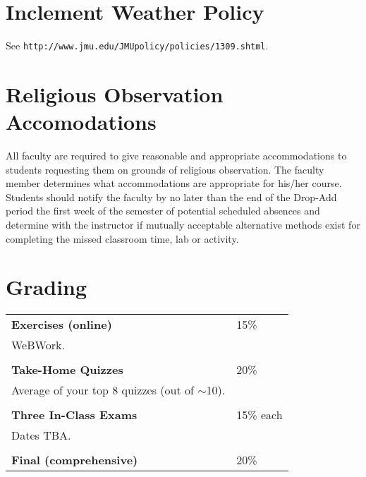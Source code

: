 \documentclass[margin,line,pifont,palatino,courier]{res}
\begin{document}
\begin{resume}
\section{\sc Inclement Weather Policy} See \verb+http://www.jmu.edu/JMUpolicy/policies/1309.shtml+. %

\vspace{0.5pc}
\section{\sc Religious Observation \\ Accomodations} All faculty are required to give reasonable and appropriate accommodations to students requesting them on grounds of religious observation. The faculty member determines what accommodations are appropriate for his/her course. Students should notify the faculty by no later than the end of the Drop-Add period the first week of the semester of potential scheduled absences and determine with the instructor if mutually acceptable alternative methods exist for completing the missed classroom time, lab or activity.


\section{\sc Grading} 
\begin{supertabular}{@{}p{0.6\textwidth} l}
	{\bf Exercises (online)} & 15\% \\
		WeBWork. & \\
		 & \\
{\bf Take-Home Quizzes} & 20\% \\
	Average of your top 8 quizzes (out of $\sim$10). & \\
 & \\
 {\bf Three In-Class Exams} & 15\% each \\
 Dates TBA. & \\
& \\
{\bf Final (comprehensive)} & 20\% \\
\end{supertabular}


\end{resume}
\end{document}
